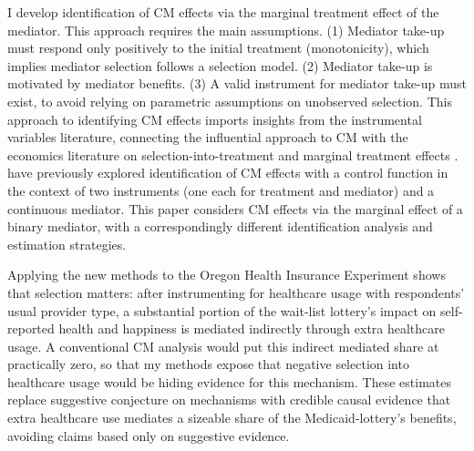 I develop identification of CM effects via the marginal treatment effect of the mediator.
This approach requires the main assumptions.
(1) Mediator take-up must respond only positively to the initial treatment (monotonicity), which implies mediator selection follows a selection model.
(2) Mediator take-up is motivated by mediator benefits.
(3) A valid instrument for mediator take-up must exist, to avoid relying on parametric assumptions on unobserved selection.
This approach to identifying CM effects imports insights from the instrumental variables literature, connecting the influential \cite{imai2010identification} approach to CM with the economics literature on selection-into-treatment and marginal treatment effects \citep{vytlacil2002independence,heckman2004using,heckman2005structural,florens2008identification,kline2019heckits}.
\cite{frolich2017direct} have previously explored identification of CM effects with a control function in the context of two instruments (one each for treatment and mediator) and a continuous mediator.
This paper considers CM effects via the marginal effect of a binary mediator, with a correspondingly different identification analysis and estimation strategies.

Applying the new methods to the Oregon Health Insurance Experiment shows that selection matters: after instrumenting for healthcare usage with respondents' usual provider type, a substantial portion of the wait-list lottery's impact on self-reported health and happiness is mediated indirectly through extra healthcare usage.
A conventional CM analysis would put this indirect mediated share at practically zero, so that my methods expose that negative selection into healthcare usage would be hiding evidence for this mechanism.
These estimates replace suggestive conjecture on mechanisms with credible causal evidence that extra healthcare use mediates a sizeable share of the Medicaid-lottery's benefits, avoiding claims based only on suggestive evidence.

